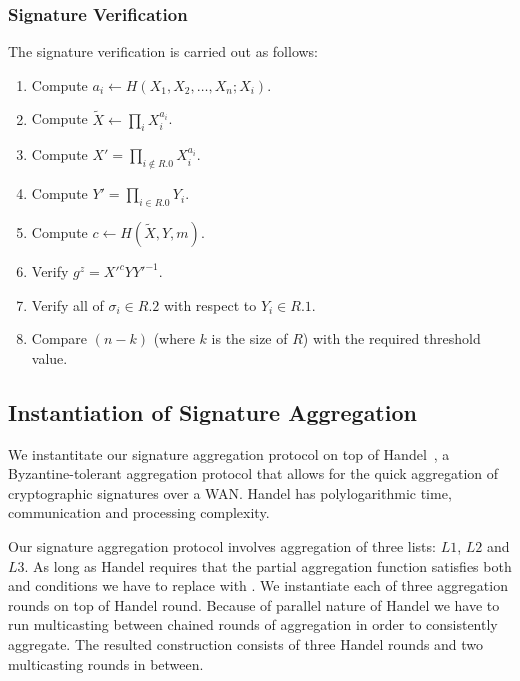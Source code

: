\subsubsection{Signature Verification}
The signature verification is carried out as follows:
\begin{enumerate}
    \item Compute ${a_i\leftarrow H(X_1,X_2,\dots,X_n;X_i)}$.
    \item Compute ${\tilde{X}\leftarrow\prod_i X_i^{a_i}}$.
    \item Compute ${X' = \prod_{i\notin R.0}X_i^{a_i}}$.
    \item Compute ${Y' = \prod_{i\in R.0} Y_i}$.
    \item Compute ${c\leftarrow H(\tilde{X}, Y, m)}$.
    \item Verify ${g^z=X'^cYY'^{-1}}$.
    \item Verify all of ${\sigma_i\in R.2}$ with respect to ${Y_i\in R.1}$.
    \item Compare ${(n-k)}$ (where $k$ is the size of $R$) with the required threshold value.
\end{enumerate}

\subsection{Instantiation of Signature Aggregation}\label{subsec:instantiation-of-signature-aggregation}

We instantitate our signature aggregation protocol on top of Handel~\cite{bégassat2019handel}, a Byzantine-tolerant aggregation protocol that allows for the quick aggregation of cryptographic signatures over a WAN\@.
Handel has polylogarithmic time, communication and processing complexity.

Our signature aggregation protocol involves aggregation of three lists: $L1$, $L2$ and $L3$.
As long as Handel requires that the partial aggregation function satisfies both  and  conditions we have to replace  with .
We instantiate each of three aggregation rounds on top of Handel round.
Because of parallel nature of Handel we have to run multicasting between chained rounds of aggregation in order to consistently aggregate.
The resulted construction consists of three Handel rounds and two multicasting rounds in between.
